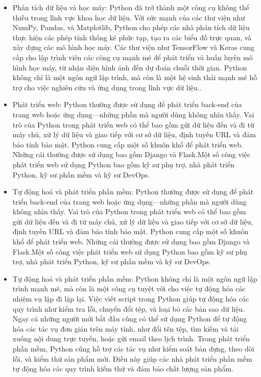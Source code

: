 \documentclass[a4paper]{article}
\begin{document}
\begin{itemize}
    \item Phân tích dữ liệu và học máy: Python đã trở thành một công cụ không thể thiếu trong lĩnh vực khoa học dữ liệu. Với sức mạnh của các thư viện như NumPy, Pandas, và Matplotlib, Python cho phép các nhà phân tích dữ liệu thực hiện các phép tính thống kê phức tạp, tạo ra các biểu đồ trực quan, và xây dựng các mô hình học máy. Các thư viện như TensorFlow và Keras cung cấp cho lập trình viên các công cụ mạnh mẽ để phát triển và huấn luyện mô hình học máy, từ nhận diện hình ảnh đến dự đoán chuỗi thời gian. Python không chỉ là một ngôn ngữ lập trình, mà còn là một hệ sinh thái mạnh mẽ hỗ trợ cho việc nghiên cứu và ứng dụng trong lĩnh vực dữ liệu..
    \item Phát triển web: Python thường được sử dụng để phát triển back-end của trang web hoặc ứng dụng—những phần mà người dùng không nhìn thấy. Vai trò của Python trong phát triển web có thể bao gồm gửi dữ liệu đến và đi từ máy chủ, xử lý dữ liệu và giao tiếp với cơ sở dữ liệu, định tuyến URL và đảm bảo tính bảo mật. Python cung cấp một số khuôn khổ để phát triển web. Những cái thường được sử dụng bao gồm Django và Flask.Một số công việc phát triển web sử dụng Python bao gồm kỹ sư phụ trợ, nhà phát triển Python, kỹ sư phần mềm và kỹ sư DevOps.
    \item Tự động hoá và phát triển phần mềm: Python thường được sử dụng để phát triển back-end của trang web hoặc ứng dụng—những phần mà người dùng không nhìn thấy. Vai trò của Python trong phát triển web có thể bao gồm gửi dữ liệu đến và đi từ máy chủ, xử lý dữ liệu và giao tiếp với cơ sở dữ liệu, định tuyến URL và đảm bảo tính bảo mật. Python cung cấp một số khuôn khổ để phát triển web. Những cái thường được sử dụng bao gồm Django và Flask.Một số công việc phát triển web sử dụng Python bao gồm kỹ sư phụ trợ, nhà phát triển Python, kỹ sư phần mềm và kỹ sư DevOps.
    \item Tự động hoá và phát triển phần mềm: Python không chỉ là một ngôn ngữ lập trình mạnh mẽ, mà còn là một công cụ tuyệt vời cho việc tự động hóa các nhiệm vụ lặp đi lặp lại. Việc viết script trong Python giúp tự động hóa các quy trình như kiểm tra lỗi, chuyển đổi tệp, và loại bỏ các bản sao dữ liệu. Ngay cả những người mới bắt đầu cũng có thể sử dụng Python để tự động hóa các tác vụ đơn giản trên máy tính, như đổi tên tệp, tìm kiếm và tải xuống nội dung trực tuyến, hoặc gửi email theo lịch trình. Trong phát triển phần mềm, Python cũng hỗ trợ các tác vụ như kiểm soát bản dựng, theo dõi lỗi, và kiểm thử sản phẩm mới. Điều này giúp các nhà phát triển phần mềm tự động hóa các quy trình kiểm thử và đảm bảo chất lượng sản phẩm.

\end{itemize}
\end{document}
